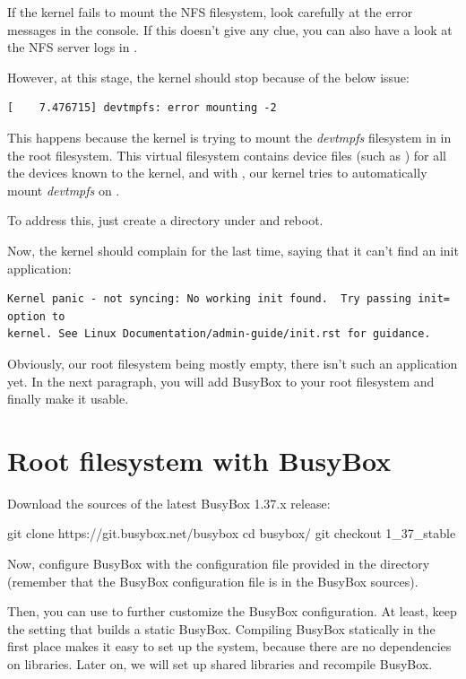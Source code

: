 If the kernel fails to mount the NFS filesystem, look carefully at the
error messages in the console. If this doesn't give any clue, you can
also have a look at the NFS server logs in .

However, at this stage, the kernel should stop because of the below
issue:

\begin{verbatim}
[    7.476715] devtmpfs: error mounting -2
\end{verbatim}

This happens because the kernel is trying to mount the {\em devtmpfs}
filesystem in  in the root filesystem. This virtual
filesystem contains device files (such as ) for all the
devices known to the kernel, and with ,
our kernel tries to automatically mount {\em devtmpfs} on .

To address this, just create a  directory under 
and reboot.

Now, the kernel should complain for the last time, saying that it can't
find an init application:

\begin{verbatim}
Kernel panic - not syncing: No working init found.  Try passing init= option to
kernel. See Linux Documentation/admin-guide/init.rst for guidance.
\end{verbatim}

Obviously, our root filesystem being mostly empty, there isn't such an
application yet. In the next paragraph, you will add BusyBox to your root
filesystem and finally make it usable.

\section{Root filesystem with BusyBox}

Download the sources of the latest BusyBox 1.37.x release:

\begin{bashinput}
git clone https://git.busybox.net/busybox
cd busybox/
git checkout 1_37_stable
\end{bashinput}

Now, configure BusyBox with the configuration file provided in the
 directory (remember that the BusyBox configuration file
is  in the BusyBox sources).

Then, you can use  to further customize
the BusyBox configuration. At least, keep the setting that
builds a static BusyBox. Compiling BusyBox statically in the first
place makes it easy to set up the system, because there are no dependencies
on libraries. Later on, we will set up shared libraries and recompile BusyBox.

